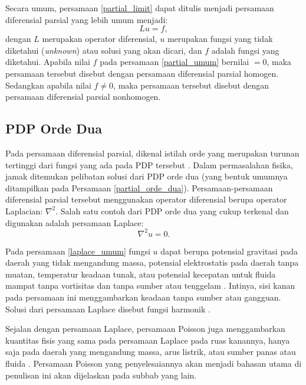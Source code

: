 Secara umum, persamaan \eqref{partial_limit} dapat ditulis menjadi persamaan diferensial parsial yang lebih umum menjadi:
\begin{equation}\label{partial_umum}
    Lu = f,
\end{equation}
dengan $L$ merupakan operator diferensial, $u$ merupakan fungsi yang tidak diketahui (\emph{unknown}) atau solusi yang akan dicari, dan $f$ adalah fungsi yang diketahui. Apabila nilai $f$ pada persamaan \eqref{partial_umum} bernilai  $= 0$, maka persamaan tersebut disebut dengan persamaan diferensial parsial homogen. Sedangkan apabila nilai $f \neq 0$, maka persamaan tersebut disebut dengan persamaan diferensial parsial nonhomogen.

\subsection{PDP Orde Dua}\label{PDP_orde_dua}
Pada persamaan diferensial parsial, dikenal istilah orde yang merupakan turunan tertinggi dari fungsi yang ada pada PDP tersebut \citep{riley_2006_mathematical}. Dalam permasalahan fisika, jamak ditemukan pelibatan solusi dari PDP orde dua (yang bentuk umumnya ditampilkan pada Persamaan \eqref{partial_orde_dua})\citep{arfken_2013_mathematical}. Persamaan-persamaan diferensial parsial tersebut menggunakan operator diferensial berupa operator Laplacian: $\nabla ^ 2$. Salah satu contoh dari PDP orde dua yang cukup terkenal dan digunakan adalah persamaan Laplace:
\begin{equation}\label{laplace_umum}
    \nabla ^2 u = 0.
\end{equation}

Pada persamaan \eqref{laplace_umum} fungsi $u$ dapat berupa potensial gravitasi pada daerah yang tidak mengandung massa, potensial elektrostatis pada daerah tanpa muatan, temperatur keadaan tunak, atau potensial kecepatan untuk fluida mampat tanpa vortisitas dan tanpa sumber atau tenggelam \citep{riley_2006_mathematical}. Intinya, sisi kanan pada persamaan ini menggambarkan keadaan tanpa sumber atau gangguan. Solusi dari persamaan Laplace disebut fungsi harmonik \citep{stewart_2020_calculus}.


Sejalan dengan persamaan Laplace, persamaan Poisson juga menggambarkan kuantitas fisis yang sama pada persamaan Laplace pada ruas kanannya, hanya saja pada daerah yang mengandung massa, arus listrik, atau sumber panas atau fluida \citep{boas_2006_mathematical}. Persamaan Poisson yang penyelesaiannya akan menjadi bahasan utama di penulisan ini akan dijelaskan pada subbab yang lain.

